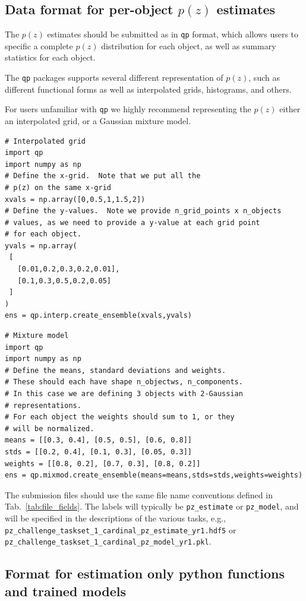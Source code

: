 \documentclass[modern]{desc-tex/styles/lsstdescnote}
\begin{document}
\subsection{Data format for per-object $p(z)$ estimates}

The $p(z)$ estimates should be submitted as in \texttt{qp} format,
which allows users to specific a complete $p(z)$ distribution for
each object, as well as summary statistics for each object.   

The \texttt{qp} packages supports several different representation of
$p(z)$, such as different functional forms as well as interpolated
grids, histograms, and others.  

For users unfamiliar with \texttt{qp} we highly recommend representing
the $p(z)$ either an interpolated grid, or a Gaussian mixture model.

\begin{verbatim}
# Interpolated grid
import qp
import numpy as np
# Define the x-grid.  Note that we put all the
# p(z) on the same x-grid
xvals = np.array([0,0.5,1,1.5,2])
# Define the y-values.  Note we provide n_grid_points x n_objects 
# values, as we need to provide a y-value at each grid point 
# for each object.
yvals = np.array(
 [
   [0.01,0.2,0.3,0.2,0.01],
   [0.1,0.3,0.5,0.2,0.05]
 ]
)
ens = qp.interp.create_ensemble(xvals,yvals)
\end{verbatim}

\begin{verbatim}
# Mixture model
import qp
import numpy as np
# Define the means, standard deviations and weights.
# These should each have shape n_objectws, n_components.
# In this case we are defining 3 objects with 2-Gaussian 
# representations.
# For each object the weights should sum to 1, or they
# will be normalized.
means = [[0.3, 0.4], [0.5, 0.5], [0.6, 0.8]]
stds = [[0.2, 0.4], [0.1, 0.3], [0.05, 0.3]]
weights = [[0.8, 0.2], [0.7, 0.3], [0.8, 0.2]]
ens = qp.mixmod.create_ensemble(means=means,stds=stds,weights=weights)
\end{verbatim}

The submission files should use the same file name conventions defined
in Tab.~\ref{tab:file_fields}.   The labels will typically be
\texttt{pz\_estimate} or \texttt{pz\_model}, and will be specified in
the descriptions of the various tasks, e.g., 
\texttt{pz\_challenge\_taskset\_1\_cardinal\_pz\_estimate\_yr1.hdf5} or
\texttt{pz\_challenge\_taskset\_1\_cardinal\_pz\_model\_yr1.pkl}.


\subsection{Format for estimation only python functions and trained models}
\end{document}
